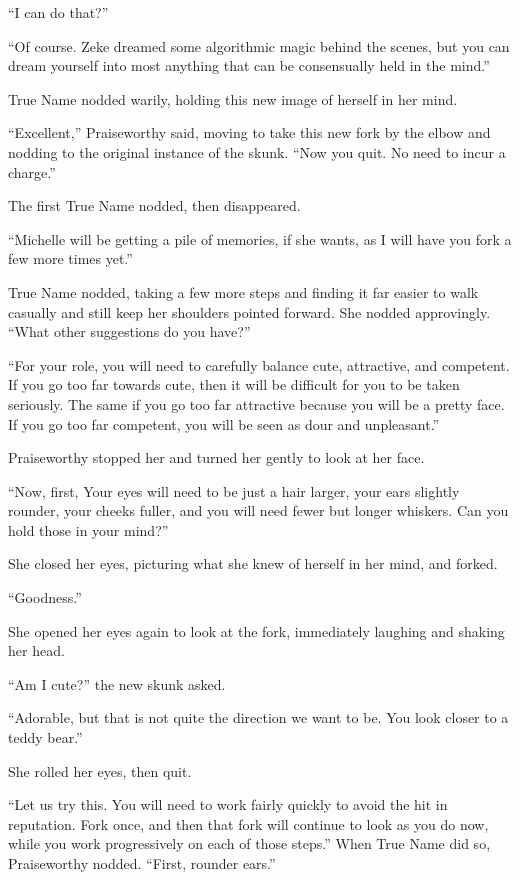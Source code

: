 ``I can do that?''

``Of course. Zeke dreamed some algorithmic magic behind the scenes, but you can dream yourself into most anything that can be consensually held in the mind.''

True Name nodded warily, holding this new image of herself in her mind.

``Excellent,'' Praiseworthy said, moving to take this new fork by the elbow and nodding to the original instance of the skunk. ``Now you quit. No need to incur a charge.''

The first True Name nodded, then disappeared.

``Michelle will be getting a pile of memories, if she wants, as I will have you fork a few more times yet.''

True Name nodded, taking a few more steps and finding it far easier to walk casually and still keep her shoulders pointed forward. She nodded approvingly. ``What other suggestions do you have?''

``For your role, you will need to carefully balance cute, attractive, and competent. If you go too far towards cute, then it will be difficult for you to be taken seriously. The same if you go too far attractive because you will be a pretty face. If you go too far competent, you will be seen as dour and unpleasant.''

Praiseworthy stopped her and turned her gently to look at her face.

``Now, first, Your eyes will need to be just a hair larger, your ears slightly rounder, your cheeks fuller, and you will need fewer but longer whiskers. Can you hold those in your mind?''

She closed her eyes, picturing what she knew of herself in her mind, and forked.

``Goodness.''

She opened her eyes again to look at the fork, immediately laughing and shaking her head.

``Am I cute?'' the new skunk asked.

``Adorable, but that is not quite the direction we want to be. You look closer to a teddy bear.''

She rolled her eyes, then quit.

``Let us try this. You will need to work fairly quickly to avoid the hit in reputation. Fork once, and then that fork will continue to look as you do now, while you work progressively on each of those steps.'' When True Name did so, Praiseworthy nodded. ``First, rounder ears.''

